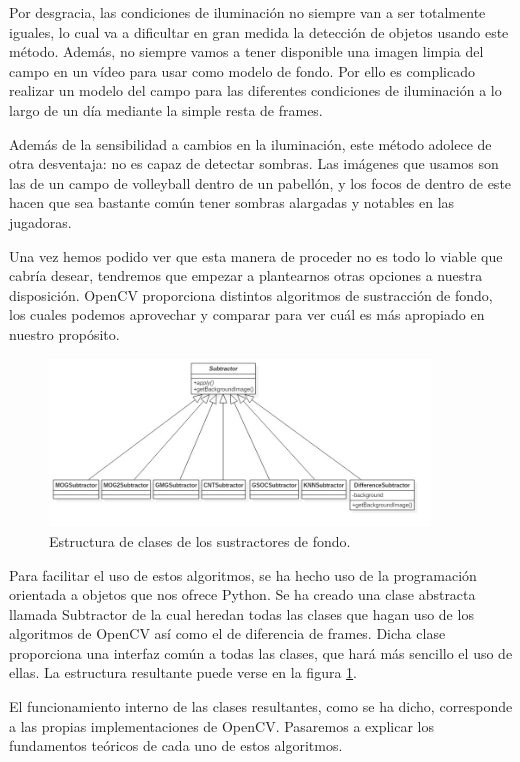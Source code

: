 Por desgracia, las condiciones de iluminación no siempre van a ser totalmente iguales, lo cual va a dificultar en gran medida la detección de objetos usando este método. Además, no siempre vamos a tener disponible una imagen limpia del campo en un vídeo para usar como modelo de fondo. Por ello es complicado realizar un modelo del campo para las diferentes condiciones de iluminación a lo largo de un día mediante la simple resta de frames.

Además de la sensibilidad a cambios en la iluminación, este método adolece de otra desventaja: no es capaz de detectar sombras. Las imágenes que usamos son las de un campo de volleyball dentro de un pabellón, y los focos de dentro de este hacen que sea bastante común tener sombras alargadas y notables en las jugadoras.

Una vez hemos podido ver que esta manera de proceder no es todo lo viable que cabría desear, tendremos que empezar a plantearnos otras opciones a nuestra disposición. OpenCV proporciona distintos algoritmos de sustracción de fondo, los cuales podemos aprovechar y comparar para ver cuál es más apropiado en nuestro propósito.

\begin{figure}
    \centering
    \includegraphics[width=0.9\textwidth]{images/subtractors}
    \caption{Estructura de clases de los sustractores de fondo.}
    \label{fig:subtractors}
\end{figure}

Para facilitar el uso de estos algoritmos, se ha hecho uso de la programación orientada a objetos que nos ofrece Python. Se ha creado una clase abstracta llamada Subtractor de la cual heredan todas las clases que hagan uso de los algoritmos de OpenCV así como el de diferencia de frames. Dicha clase proporciona una interfaz común a todas las clases, que hará más sencillo el uso de ellas. La estructura resultante puede verse en la figura \ref{fig:subtractors}.

El funcionamiento interno de las clases resultantes, como se ha dicho, corresponde a las propias implementaciones de OpenCV. Pasaremos a explicar los fundamentos teóricos de cada uno de estos algoritmos.

